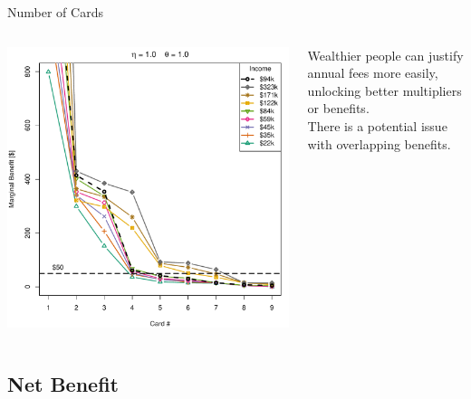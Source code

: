 \begin{frame}{Number of Cards}
    \begin{columns}[c]
        \begin{column}{0.7\textwidth}
            \includegraphics[width=0.9\textheight]{../Figures/MBvsKvsIncome_1_1.pdf}
        \end{column}
        \begin{column}{0.3\textwidth}
            \centering
            Wealthier people can justify annual fees more easily, unlocking better multipliers or benefits.\\
            \bigskip
            There is a potential issue with overlapping benefits.
        \end{column}
    \end{columns}
\end{frame} 


\subsection{Net Benefit}

